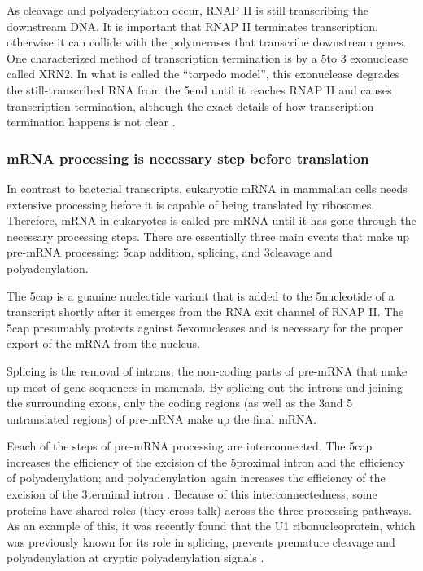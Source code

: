 As cleavage and polyadenylation occur, RNAP II is still transcribing the
downstream DNA. It is important that RNAP II terminates transcription,
otherwise it can collide with the polymerases that transcribe downstream
genes. One characterized method of transcription termination is by a 5\p to 3\p
exonuclease called XRN2. In what is called the ``torpedo model'', this
exonuclease degrades the still-transcribed RNA from the 5\p end until it
reaches RNAP II and causes transcription termination, although the exact
details of how transcription termination happens is not clear
\cite{kuehner_unravelling_2011}.

\subsubsection{mRNA processing is necessary step before translation}
In contrast to bacterial transcripts, eukaryotic mRNA in mammalian cells needs
extensive processing before it is capable of being translated by ribosomes.
Therefore, mRNA in eukaryotes is called pre-mRNA until it has gone through the
necessary processing steps. There are essentially three main events that make
up pre-mRNA processing: 5\p cap addition, splicing, and 3\p cleavage and
polyadenylation.

The 5\p cap is a guanine nucleotide variant that is added to the 5\p nucleotide
of a transcript shortly after it emerges from the RNA exit channel of RNAP II.
The 5\p cap presumably protects against 5\p exonucleases and is necessary for
the proper export of the mRNA from the nucleus.

Splicing is the removal of introns, the non-coding parts of pre-mRNA that make
up most of gene sequences in mammals. By splicing out the introns and joining
the surrounding exons, only the coding regions (as well as the 3\p and 5\p
untranslated regions) of pre-mRNA make up the final mRNA.

Eeach of the steps of pre-mRNA processing are interconnected. The 5\p cap
increases the efficiency of the excision of the 5\p proximal intron and the
efficiency of polyadenylation; and polyadenylation again increases the
efficiency of the excision of the 3\p terminal intron
\cite{proudfoot_integrating_2002}. Because of this interconnectedness, some
proteins have shared roles (they cross-talk) across the three processing
pathways. As an example of this, it was recently found that the U1
ribonucleoprotein, which was previously known for its role in splicing,
prevents premature cleavage and polyadenylation at cryptic polyadenylation
signals \cite{kaida_u1_2010}.

